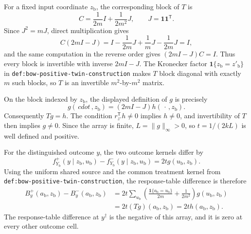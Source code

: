 For a fixed input coordinate \(z_{\mathrm b}\), the corresponding block of \(T\) is
\[
 C=\frac{1}{2m}I+\frac{1}{2m^2}J,
 \qquad J=\mathbf 1\mathbf 1^{\mathsf T}.
\]
Since \(J^2=mJ\), direct multiplication gives
\[
 C(2mI-J)
 =I-\frac{1}{2m}J+\frac{1}{m}J-\frac{1}{2m}J=I,
\]
and the same computation in the reverse order gives \((2mI-J)C=I\).  Thus every block is invertible with inverse \(2mI-J\).  The Kronecker factor \(\mathbf 1\{z_{\mathrm b}=z'_{\mathrm b}\}\) in \texttt{def:bow-positive-twin-construction} makes \(T\) block diagonal with exactly \(m\) such blocks, so \(T\) is an invertible \(m^2\)-by-\(m^2\) matrix.

On the block indexed by \(z_{\mathrm b}\), the displayed definition of \(g\) is precisely
\[
 g(\,cdot\,,z_{\mathrm b})=(2mI-J)h(\,\cdot\,,z_{\mathrm b}).
\]
Consequently \(Tg=h\).  The condition \(r_{z^{\circ}}^{\mathsf T}h\ne0\) implies \(h\ne0\), and invertibility of \(T\) then implies \(g\ne0\).  Since the array is finite, \(L=\lVert g\rVert_\infty>0\), so \(t=1/(2kL)\) is well defined and positive.

For the distinguished outcome \(y\), the two outcome kernels differ by
\[
 f^+_{Y_{\mathrm b}}(y\mid z_{\mathrm b},u_{\mathrm b})
 -f^-_{Y_{\mathrm b}}(y\mid z_{\mathrm b},u_{\mathrm b})
 =2t g(u_{\mathrm b},z_{\mathrm b}).
\]
Using the uniform shared source and the common treatment kernel from \texttt{def:bow-positive-twin-construction}, the response-table difference is therefore
\[
\begin{aligned}
 B_y^+(a_{\mathrm b},z_{\mathrm b})-B_y^-(a_{\mathrm b},z_{\mathrm b})
 &=2t\sum_{u_{\mathrm b}}
 \left(\frac{\mathbf 1\{a_{\mathrm b}=u_{\mathrm b}\}}{2m}
 +\frac{1}{2m^2}\right)g(u_{\mathrm b},z_{\mathrm b})\\
 &=2t(Tg)(a_{\mathrm b},z_{\mathrm b})
 =2t h(a_{\mathrm b},z_{\mathrm b}).
\end{aligned}
\]
The response-table difference at \(y^{\dagger}\) is the negative of this array, and it is zero at every other outcome cell.

